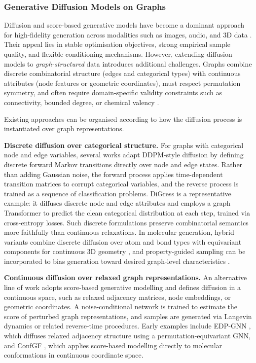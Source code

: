 \subsubsection{Generative Diffusion Models on Graphs}
\label{sec:related:graph_diffusion_paradigms}

Diffusion and score-based generative models have become a dominant
approach for high-fidelity generation across modalities such as images,
audio, and 3D data \citep{ho2022cascaded,kong2021diffwave,luo2021pointcloud}.
Their appeal lies in stable optimisation objectives, strong empirical
sample quality, and flexible conditioning mechanisms.
However, extending diffusion models to \emph{graph-structured} data
introduces additional challenges. Graphs combine discrete combinatorial
structure (edges and categorical types) with continuous attributes
(node features or geometric coordinates), must respect permutation
symmetry, and often require domain-specific validity constraints such as
connectivity, bounded degree, or chemical valency
\citep{jo2022gdss,vignac2022digress}.

Existing approaches can be organised according to how the diffusion
process is instantiated over graph representations.

\textbf{Discrete diffusion over categorical structure.}
For graphs with categorical node and edge variables, several works
adapt DDPM-style diffusion by defining discrete forward Markov
transitions directly over node and edge states.
Rather than adding Gaussian noise, the forward process applies
time-dependent transition matrices to corrupt categorical variables,
and the reverse process is trained as a sequence of classification
problems. DiGress \citep{vignac2022digress} is a representative
example: it diffuses discrete node and edge attributes and employs
a graph Transformer to predict the clean categorical distribution
at each step, trained via cross-entropy losses.
Such discrete formulations preserve combinatorial semantics more
faithfully than continuous relaxations.
In molecular generation, hybrid variants combine discrete diffusion
over atom and bond types with equivariant components for continuous
3D geometry \citep{hoogeboom2022equivariant}, and property-guided
sampling can be incorporated to bias generation toward desired
graph-level characteristics \citep{ho2022classifier}.

\textbf{Continuous diffusion over relaxed graph representations.}
An alternative line of work adopts score-based generative modelling
\citep{song2019generative,song2020score} and defines diffusion in a
continuous space, such as relaxed adjacency matrices, node embeddings,
or geometric coordinates.
A noise-conditional network is trained to estimate the score of
perturbed graph representations, and samples are generated via
Langevin dynamics or related reverse-time procedures.
Early examples include EDP-GNN \citep{niu2020permutation}, which
diffuses relaxed adjacency structure using a permutation-equivariant
GNN, and ConfGF \citep{shi2021learning}, which applies score-based
modelling directly to molecular conformations in continuous coordinate
space.

